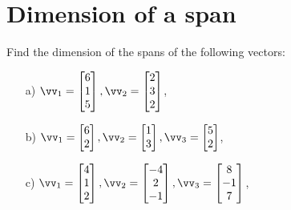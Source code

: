 

\section{Dimension of a span}
\begin{problem}%
    Find the dimension of the spans of the following vectors:

    \begin{enumerate}
        \item[a) ] $\vv_1=\begin{bmatrix}6\\1\\5\end{bmatrix},  \vv_2=\begin{bmatrix}
            2\\3\\2
        \end{bmatrix}$,

        
        \item[b) ] $\vv_1=\begin{bmatrix}6\\2\end{bmatrix},  \vv_2=\begin{bmatrix}
            1\\3
        \end{bmatrix},  \vv_3=\begin{bmatrix}
            5\\2
        \end{bmatrix}$,
        
        \item[c) ] $\vv_1=\begin{bmatrix}4\\1\\2\end{bmatrix},  \vv_2=\begin{bmatrix}
            -4\\2\\-1
        \end{bmatrix},  \vv_3=\begin{bmatrix}
            8\\-1\\7
        \end{bmatrix}$,
        

\end{enumerate}
\end{problem}
